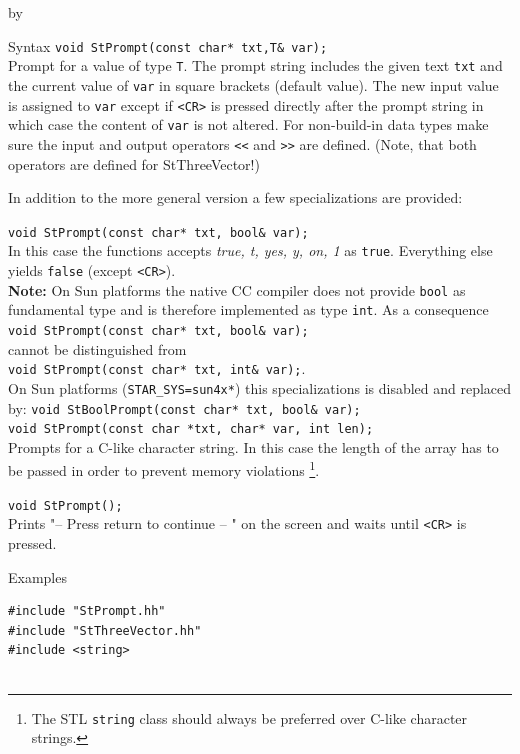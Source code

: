 \documentclass[twoside]{article}
\newcommand{\comp}[1]{\texttt{#1}}%
\newcommand{\entrylabel}[1]{\mbox{\textbf{{#1}}}\hfil}%
\newenvironment{entry}
{\begin{list}{}%
    {\renewcommand{\makelabel}{\entrylabel}%
     \setlength{\labelwidth}{90pt}%
     \setlength{\leftmargin}{\labelwidth}
     \advance\leftmargin by \labelsep%
      }%
    }%
  {\end{list}}
\newcommand{\Entrylabel}[1]%
{\raisebox{0pt}[1ex][0pt]{\makebox[\labelwidth][l]%
    {\parbox[t]{\labelwidth}{\hspace{0pt}\textbf{{#1}}}}}}
\newenvironment{Entry}%
{\renewcommand{\entrylabel}{\Entrylabel}\begin{entry}}%
  {\end{entry}}
\begin{document}
\begin{description}
\begin{Entry}
\item[Syntax]
    \verb+void StPrompt(const char* txt,T& var);+\\
    Prompt for a value of type \comp{T}. The prompt string includes
    the given text \comp{txt} and the current value of \comp{var}
    in square brackets (default value). The new input value is assigned
    to \comp{var} except if \verb+<CR>+ is pressed directly after the prompt
    string in which case the content of \comp{var} is not altered.
    For non-build-in data types make sure the input and output 
    operators \verb+<<+ and \verb+>>+ are defined. (Note, that 
    both operators are defined for StThreeVector!)

    In addition to the more general version a few specializations
    are provided:

    \verb+void StPrompt(const char* txt, bool& var);+\\
    In this case the functions accepts \textit{true, t, yes, y, on, 1}
    as \comp{true}. Everything else yields \comp{false}
    (except \verb+<CR>+).\\
    {\bf Note:} On Sun platforms the native CC compiler does not provide \comp{bool}
    as fundamental type and is therefore implemented as type \comp{int}.
    As a consequence \\
    \verb+void StPrompt(const char* txt, bool& var);+\\
    cannot be distinguished from \\
    \verb+void StPrompt(const char* txt, int& var);+.\\
    On Sun platforms (\comp{STAR\_SYS=sun4x*}) this specializations is
    disabled and replaced by:
    \verb+void StBoolPrompt(const char* txt, bool& var);+\\    

    \verb+void StPrompt(const char *txt, char* var, int len);+\\
    Prompts for a C-like character string. In this case the length
    of the array has to be passed in order to prevent memory violations
    \footnote{The STL \comp{string} class should always be preferred
        over C-like character strings.}.
    
    \verb+void StPrompt();+\\
    Prints "-- Press return to continue -- " on the screen and waits
    until \verb+<CR>+ is pressed. 
    
\item[Examples]
{\footnotesize
\begin{verbatim}
#include "StPrompt.hh"
#include "StThreeVector.hh"
#include <string>


\end{verbatim}}
\end{Entry}
\end{description}
\end{document}
